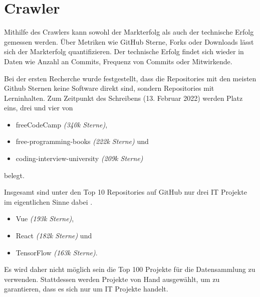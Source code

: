\chapter{Crawler}




Mithilfe des Crawlers kann sowohl der Markterfolg als auch der technische Erfolg gemessen werden.
Über Metriken wie GitHub Sterne, Forks oder Downloads lässt sich der Markterfolg quantifizieren.
Der technische Erfolg findet sich wieder in Daten wie Anzahl an Commits, Frequenz von Commits oder Mitwirkende.

Bei der ersten Recherche wurde festgestellt, dass die Repositories mit den meisten Github Sternen
keine Software direkt sind, sondern Repositories mit Lerninhalten.
Zum Zeitpunkt des Schreibens (13. Februar 2022) werden Platz eins, drei und vier von
\begin{itemize}
    \item freeCodeCamp \textit{(340k Sterne)},
    \item free-programming-books \textit{(222k Sterne)} und
    \item coding-interview-university \textit{(209k Sterne)}
\end{itemize}
belegt.

\bigskip

\noindent
Insgesamt sind unter den Top 10 Repositories auf GitHub nur drei IT Projekte im eigentlichen
Sinne dabei \cite{TopGitHubProjects}.
\begin{itemize}
    \item Vue \textit{(193k Sterne)},
    \item React \textit{(182k Sterne)} und
    \item TensorFlow \textit{(163k Sterne)}.
\end{itemize}


\bigskip
\noindent
Es wird daher nicht möglich sein die Top 100 Projekte für die Datensammlung zu verwenden.
Stattdessen werden Projekte von Hand ausgewählt, um zu garantieren, dass es sich nur um IT Projekte handelt.




